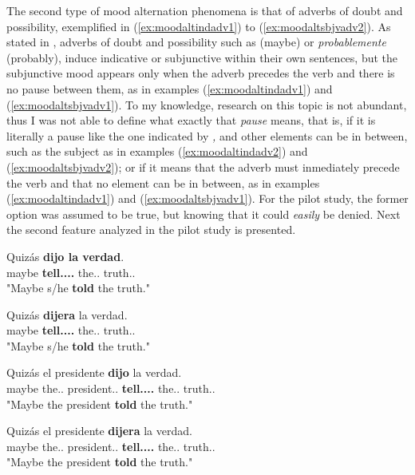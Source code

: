 The second type of mood alternation phenomena is that of adverbs of doubt and possibility, exemplified in (\ref{ex:moodaltindadv1}) to (\ref{ex:moodaltsbjvadv2}). As stated in \citet{espanola2010nueva}, adverbs of doubt and possibility such as  (maybe) or \textit{probablemente} (probably), induce indicative or subjunctive within their own sentences, but the subjunctive mood appears only when the adverb precedes the verb and there is no pause between them, as in examples (\ref{ex:moodaltindadv1}) and (\ref{ex:moodaltsbjvadv1}). To my knowledge, research on this topic is not abundant, thus I was not able to define what exactly that \textit{pause} means, that is, if it is literally a pause  like the one indicated by \textit{,} and other elements can be in between, such as the subject as in examples (\ref{ex:moodaltindadv2}) and (\ref{ex:moodaltsbjvadv2}); or if it means that the adverb must inmediately precede the verb and that no element can be in between, as in examples (\ref{ex:moodaltindadv1}) and (\ref{ex:moodaltsbjvadv1}). For the pilot study, the former option was assumed to be true, but knowing that it could \textit{easily} be denied. Next the second feature analyzed in the pilot study is presented.\\

\begin{exe}
  \ex
    \begin{xlist}
      \item{\gll Quizás \textbf{dijo la verdad}. \\ maybe \textbf{tell.\Pst.\Pfv.\Ind.\Tsg{}} the.\F.\Sg{} truth.\F.\Sg{} \\ "Maybe s/he \textbf{told} the truth."}\label{ex:moodaltindadv1}
      \item{\gll Quizás \textbf{dijera} la verdad.\\ maybe \textbf{tell.\Pst.\Pfv.\Sbjv.\Tsg{}} the.\F.\Sg{} truth.\F.\Sg{} \\ "Maybe s/he \textbf{told} the truth."}\label{ex:moodaltsbjvadv1}
      \item{\gll Quizás el presidente \textbf{dijo} la verdad.\\ maybe the.\M.\Sg{} president.\M.\Sg{} \textbf{tell.\Pst.\Pfv.\Ind.\Tsg{}} the.\F.\Sg{} truth.\F.\Sg{} \\ "Maybe the president \textbf{told} the truth."}\label{ex:moodaltindadv2}
      \item{\gll Quizás el presidente \textbf{dijera} la verdad.\\ maybe the.\M.\Sg{} president.\M.\Sg{} \textbf{tell.\Pst.\Pfv.\Sbjv.\Tsg{}} the.\F.\Sg{} truth.\F.\Sg{} \\ "Maybe the president \textbf{told} the truth."}\label{ex:moodaltsbjvadv2}
    \end{xlist}
\end{exe}

